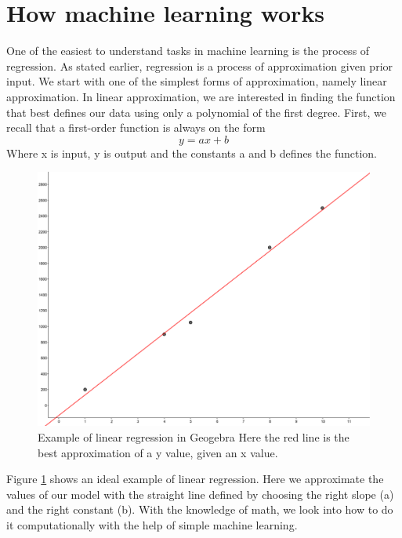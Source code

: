 \section{How machine learning works}   
One of the easiest to understand tasks in machine learning is the process of regression. As stated earlier, regression is a process of approximation given prior input.
We start with one of the simplest forms of approximation, namely linear approximation. In linear approximation, we are interested in finding the function that best defines our data using only a polynomial of the first degree.  First, we recall that a first-order function is always on the form
\begin{equation}
y = ax +b 
\end{equation}
Where x is input, y is output and the constants a and b defines the function.
    
\begin{figure}[h]
\centering
\includegraphics[scale=0.1]{background/figures/linear_regression.png}
\caption{Example of linear regression in Geogebra Here the red line is the best approximation of a y value, given an x value.} 
\label{fig:geogebra}
\end{figure} %
Figure \ref{fig:geogebra} shows an ideal example of linear regression. Here we approximate the values of our model with the straight line defined by choosing the right slope (a) and the right constant (b).
With the knowledge of math, we look into how to do it computationally with the help of simple machine learning. 


